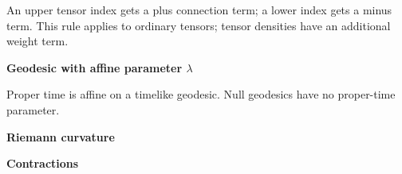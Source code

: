 \documentclass[
  11pt,
  letterpaper,
  oneside,
  openany]{scrbook}
\begin{document}
\begin{center}
\begingroup
{}
\ifdim\wd\grmathbox>\linewidth
\resizebox{\linewidth}{!}{\usebox{\grmathbox}}
\else\usebox{\grmathbox}\fi
\endgroup
\end{center}

\begin{center}
\begingroup
{}
\ifdim\wd\grmathbox>\linewidth
\resizebox{\linewidth}{!}{\usebox{\grmathbox}}
\else\usebox{\grmathbox}\fi
\endgroup
\end{center}

An upper tensor index gets a plus connection term; a lower index gets a
minus term. This rule applies to ordinary tensors; tensor densities have
an additional weight term.

\textbf{Geodesic with affine parameter \(\lambda\)}

\begin{center}
\begingroup
{}
\ifdim\wd\grmathbox>\linewidth
\resizebox{\linewidth}{!}{\usebox{\grmathbox}}
\else\usebox{\grmathbox}\fi
\endgroup
\end{center}

Proper time is affine on a timelike geodesic. Null geodesics have no
proper-time parameter.

\textbf{Riemann curvature}

\begin{center}
\begingroup
{}
\ifdim\wd\grmathbox>\linewidth
\resizebox{\linewidth}{!}{\usebox{\grmathbox}}
\else\usebox{\grmathbox}\fi
\endgroup
\end{center}

\textbf{Contractions}

\begin{center}
\begingroup
{}
\ifdim\wd\grmathbox>\linewidth
\resizebox{\linewidth}{!}{\usebox{\grmathbox}}
\else\usebox{\grmathbox}\fi
\endgroup
\end{center}
\end{document}
